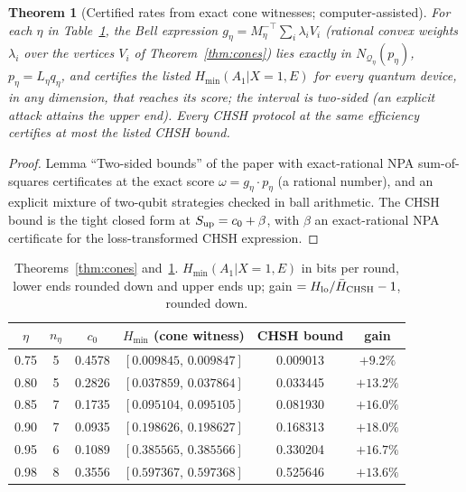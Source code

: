 \documentclass[11pt]{article}
\newtheorem{theorem}{Theorem}
\theoremstyle{definition}\newtheorem{definition}{Definition}
\theoremstyle{remark}\newtheorem{remark}{Remark}
\newcommand{\Q}{\mathcal Q}
\begin{document}
\begin{theorem}[Certified rates from exact cone witnesses; computer-assisted]\label{thm:rates}
For each $\eta$ in Table~\ref{tab:main}, the Bell expression $g_\eta=M_\eta^{-\top}\sum_i\lambda_iV_i$ (rational convex weights $\lambda_i$ over the vertices $V_i$ of Theorem~\ref{thm:cones}) lies exactly in $N_{\Q_\eta}(p_\eta)$, $p_\eta=L_\eta q_\eta$, and certifies the listed $H_{\min}(A_1|X{=}1,E)$ for every quantum device, in any dimension, that reaches its score; the interval is two-sided (an explicit attack attains the upper end). Every CHSH protocol at the same efficiency certifies at most the listed CHSH bound.
\end{theorem}
\begin{proof}
Lemma ``Two-sided bounds'' of the paper with exact-rational NPA sum-of-squares certificates at the exact score $\omega=g_\eta\cdot p_\eta$ (a rational number), and an explicit mixture of two-qubit strategies checked in ball arithmetic. The CHSH bound is the tight closed form at $S_{\rm up}=c_0+\beta$, with $\beta$ an exact-rational NPA certificate for the loss-transformed CHSH expression.
\end{proof}

\begin{table}[h]\centering
\begin{tabular}{cccccc}
$\eta$ & $n_\eta$ & $c_0$ & $H_{\min}$ (cone witness) & CHSH bound & gain\\\hline
0.75 & 5 & 0.4578 & $[0.009845,\,0.009847]$ & 0.009013 & $+9.2\%$\\
0.80 & 5 & 0.2826 & $[0.037859,\,0.037864]$ & 0.033445 & $+13.2\%$\\
0.85 & 7 & 0.1735 & $[0.095104,\,0.095105]$ & 0.081930 & $+16.0\%$\\
0.90 & 7 & 0.0935 & $[0.198626,\,0.198627]$ & 0.168313 & $+18.0\%$\\
0.95 & 6 & 0.1089 & $[0.385565,\,0.385566]$ & 0.330204 & $+16.7\%$\\
0.98 & 8 & 0.3556 & $[0.597367,\,0.597368]$ & 0.525646 & $+13.6\%$\\
\end{tabular}
\caption{Theorems~\ref{thm:cones} and~\ref{thm:rates}. $H_{\min}(A_1|X{=}1,E)$ in bits per round, lower ends rounded down and upper ends up; gain $=H_{\rm lo}/\bar H_{\rm CHSH}-1$, rounded down.}\label{tab:main}
\end{table}
\end{document}
